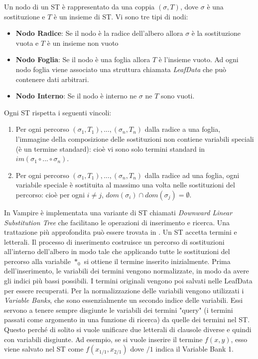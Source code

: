 \documentclass[./main.tex]{subfiles}
\begin{document}
Un nodo di un ST è rappresentato da una coppia $(\sigma, T)$, dove $\sigma$ è una sostituzione e $T$ è un insieme di ST.
Vi sono tre tipi di nodi:

\begin{itemize}
    \item \textbf{Nodo Radice}: Se il nodo è la radice dell'albero allora $\sigma$ è la sostituzione vuota e $T$ è un insieme non vuoto
    \item \textbf{Nodo Foglia}: Se il nodo è una foglia allora $T$ è l'insieme vuoto. Ad ogni nodo foglia 
    viene associato una struttura chiamata \textit{LeafData} che può contenere dati arbitrari.
    \item \textbf{Nodo Interno}: Se il nodo è interno ne $\sigma$ ne $T$ sono vuoti.
\end{itemize}


Ogni ST rispetta i seguenti vincoli:

\begin{enumerate}
    \item Per ogni percorso $(\sigma_1, T_1), ... , (\sigma_n, T_n)$
     dalla radice a una foglia, l'immagine della composizione delle sostituzioni non contiene variabili speciali (è un termine standard):
     cioè vi sono solo termini standard in $im(\sigma_1 \circ ... \circ \sigma_n)$.
    \item Per ogni percorso $(\sigma_1, T_1), ... , (\sigma_n, T_n)$
    dalla radice ad una foglia, ogni variabile speciale è sostituita al massimo una volta nelle sostituzioni del percorso:
    cioè per ogni $i \neq j$, $dom(\sigma_i) \cap dom(\sigma_j) = \emptyset$.
\end{enumerate}

In Vampire è implementata una variante di ST chiamati \textit{Downward Linear Substitution Tree} che facilitano
le operazioni di inserimento e ricerca. Una trattazione più approfondita può essere trovata in \cite{vampireUnification}.
Un ST accetta termini e letterali. Il processo di inserimento costruisce un percorso di sostituzioni all'interno dell'albero
in modo tale che applicando tutte le sostituzioni del percorso alla variabile $*_0$ si ottiene il termine inserito inizialmente.
Prima dell'inserimento, le variabili dei termini vengono normalizzate,
in modo da avere gli indici più bassi possibili. I termini originali vengono poi salvati nelle LeafData per essere recuperati.
Per la normalizzazione delle variabili vengono utilizzati i \textit{Variable Banks}, che sono essenzialmente un secondo indice delle variabili.
Essi servono a tenere sempre disgiunte le variabili dei termini "query" (i termini passati come argomento in una funzione di ricerca)
da quelle dei termini nel ST. 
Questo perché di solito si vuole unificare due letterali di clausole diverse e quindi con variabili disgiunte.
Ad esempio, se si vuole inserire il termine $f(x, y)$, esso viene salvato nel ST come
$f(x_{1/1}, x_{2/1})$ dove $/1$ indica il Variable Bank 1.
\end{document}
